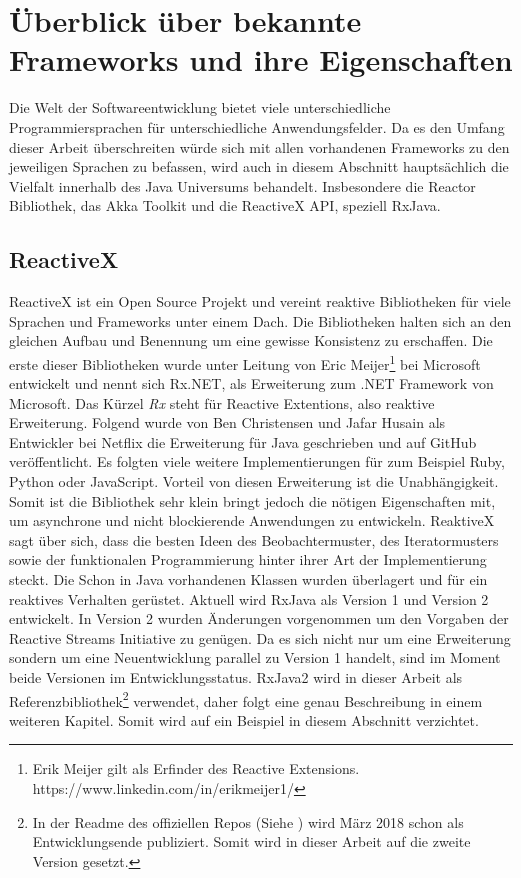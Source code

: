 \section{Überblick über bekannte Frameworks und ihre Eigenschaften}
Die Welt der Softwareentwicklung bietet viele unterschiedliche Programmiersprachen für unterschiedliche Anwendungsfelder. Da es den Umfang dieser Arbeit überschreiten würde sich mit allen vorhandenen Frameworks zu den jeweiligen Sprachen zu befassen, wird auch in diesem Abschnitt hauptsächlich die Vielfalt innerhalb des Java Universums behandelt. Insbesondere die Reactor Bibliothek, das Akka Toolkit und die ReactiveX API, speziell RxJava.
\subsection{ReactiveX}
ReactiveX ist ein Open Source Projekt und vereint reaktive Bibliotheken für viele Sprachen und Frameworks unter einem Dach. Die Bibliotheken halten sich an den gleichen Aufbau und Benennung um eine gewisse Konsistenz zu erschaffen. Die erste dieser Bibliotheken wurde unter Leitung von Eric Meijer\footnote{Erik Meijer gilt als Erfinder des Reactive Extensions. https://www.linkedin.com/in/erikmeijer1/} bei Microsoft entwickelt und nennt sich Rx.NET, als Erweiterung zum .NET Framework von Microsoft. Das Kürzel \textit{Rx} steht für Reactive Extentions, also reaktive Erweiterung. Folgend wurde von Ben Christensen und Jafar Husain als Entwickler bei Netflix die Erweiterung für Java geschrieben und auf GitHub veröffentlicht. Es folgten viele weitere Implementierungen für zum Beispiel Ruby, Python oder JavaScript. Vorteil von diesen Erweiterung ist die Unabhängigkeit. Somit ist die Bibliothek sehr klein bringt jedoch die nötigen Eigenschaften mit, um asynchrone und nicht blockierende Anwendungen zu entwickeln. ReaktiveX sagt über sich, dass die besten Ideen des Beobachtermuster, des Iteratormusters sowie der funktionalen Programmierung hinter ihrer Art der Implementierung steckt. Die Schon in Java vorhandenen Klassen wurden überlagert und für ein reaktives Verhalten gerüstet. Aktuell wird RxJava als Version 1 und Version 2 entwickelt. In Version 2 wurden Änderungen vorgenommen um den Vorgaben der Reactive Streams Initiative zu genügen. Da es sich nicht nur um eine Erweiterung sondern um eine Neuentwicklung parallel zu Version 1 handelt, sind im Moment beide Versionen im Entwicklungsstatus. RxJava2 wird in dieser Arbeit als Referenzbibliothek\footnote{In der Readme des offiziellen Repos (Siehe \cite{rx.repo}) wird März 2018 schon als Entwicklungsende publiziert. Somit wird in dieser Arbeit auf die zweite Version gesetzt.} verwendet, daher folgt eine genau Beschreibung in einem weiteren Kapitel. Somit wird auf ein Beispiel in diesem Abschnitt verzichtet.
